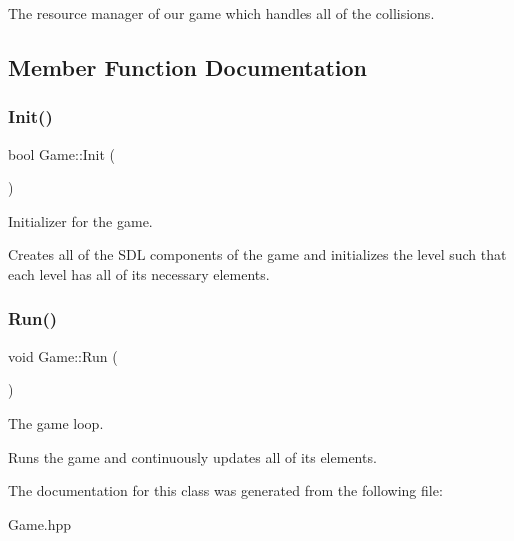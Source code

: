 The resource manager of our game which handles all of the collisions. 

\subsection{Member Function Documentation}
\mbox{\label{classGame_ab19596de871e7ce3ce5effc888c2a30b}} 
\subsubsection{\texorpdfstring{Init()}{Init()}}
{\footnotesize\ttfamily bool Game\+::\+Init (\begin{DoxyParamCaption}{ }\end{DoxyParamCaption})}



Initializer for the game. 

Creates all of the S\+DL components of the game and initializes the level such that each level has all of its necessary elements. \mbox{\label{classGame_a96341ca5b54d90adc3ecb3bf0bcd2312}} 
\subsubsection{\texorpdfstring{Run()}{Run()}}
{\footnotesize\ttfamily void Game\+::\+Run (\begin{DoxyParamCaption}{ }\end{DoxyParamCaption})}



The game loop. 

Runs the game and continuously updates all of its elements. 

The documentation for this class was generated from the following file\+:\begin{DoxyCompactItemize}
\item 
Game.\+hpp\end{DoxyCompactItemize}
